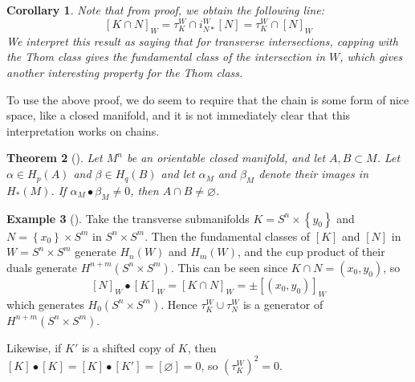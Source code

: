 \documentclass[reqno]{amsart}
\newtheorem{theorem}{Theorem}[section]
\newtheorem{corollary}[theorem]{Corollary}
\theoremstyle{definition}
\newtheorem{example}[theorem]{Example}
\theoremstyle{remark}
\begin{document}
      \begin{corollary}\label{Cor:DNIZKJ}
          Note that from proof, we obtain the following line:
          \[
          \left[ K \cap N \right]_W = 
          \tau_K^{W} \cap i_{N*}^{W} \left[ N \right] 
          = \tau_K^{W} \cap \left[ N \right]_W
          \] 
          We interpret this result as saying that for transverse intersections,
          capping with the Thom class gives the 
          fundamental class of the intersection in
          $W$, which gives another interesting property for the
          Thom class.
      \end{corollary}

          To use the above proof, we do seem to require
          that the chain is some form of nice space, like a closed manifold,
          and it is not immediately clear that this interpretation
          works on chains.
      





      \begin{theorem}[]\cite[VI, Theorem 11.10]{Bredon}
          Let $M^{n}$ be an orientable closed manifold, and let
          $A , B \subset M$. Let $\alpha \in H_p (A)$ and
          $\beta \in H_q (B)$ and let 
          $\alpha_M$ and $\beta_M$ denote their images in
          $H_* (M)$. If $\alpha_M \bullet \beta_M \neq 0$, then
          $A \cap B \neq \varnothing$.
      \end{theorem}



      \begin{example}[]
          Take the transverse submanifolds
          $K = S^{n} \times \left\{ y_0 \right\} $ and
          $N = \left\{ x_0 \right\} \times S^{m}$ in
          $S^{n} \times S^{m}$.
          Then the fundamental classes
          of $\left[ K \right] $ and $\left[ N \right] $ in
          $W = S^{n} \times S^{m}$ generate
          $H_n(W)$ and $H_m(W)$, and
           the cup product of their duals
           generate
           $H^{n+m}(S^{n} \times S^{m})$. This can be seen
           since
           $K \cap N = \left( x_0,y_0 \right) $, so
           \[
           \left[ N \right]_W \bullet \left[ K \right]_W 
           = \left[ K \cap N \right]_W =
           \pm \left[ \left( x_0,y_0 \right)  \right]_W
           \] 
           which generates
           $H_0 (S^{n} \times S^{m})$.
           Hence
           $\tau_K^{W} \cup \tau_N^{W}$ is a generator
           of $H^{n+m}(S^{n} \times S^{m})$.

           Likewise, if $K'$ is a shifted copy of $K$,
           then $\left[ K \right] \bullet
           \left[ K \right] = \left[ K \right] \bullet
           \left[ K' \right] = \left[ \varnothing \right] = 0$, so
           $\left( \tau_K^{W} \right)^2 = 0$.

      \end{example}
\end{document}
